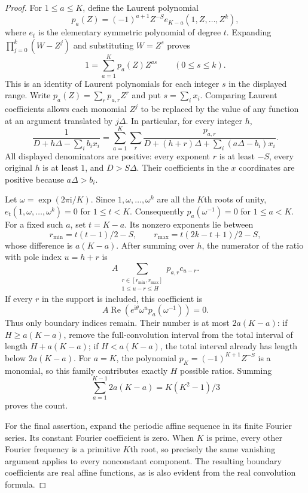\documentclass[11pt]{article}
\begin{document}
\begin{proof}
For $1\le a\le K$, define the Laurent polynomial
\[
 p_a(Z)=(-1)^{a+1}Z^{-S}
 e_{K-a}(1,Z,\ldots,Z^k),
\]
where $e_t$ is the elementary symmetric polynomial of degree $t$.
Expanding $\prod_{j=0}^k(W-Z^j)$ and substituting $W=Z^s$ proves
\[
 1=\sum_{a=1}^K p_a(Z)Z^{as}
 \qquad(0\le s\le k).
\]
This is an identity of Laurent polynomials for each integer $s$ in
the displayed range. Write $p_a(Z)=\sum_r p_{a,r}Z^r$ and put
$s=\sum_i x_i$. Comparing Laurent coefficients allows each monomial
$Z^j$ to be replaced by the value of any function at an argument
translated by $j\Delta$. In particular, for every integer $h$,
\[
 \frac1{D+h\Delta-\sum_i b_i x_i}
 =\sum_{a=1}^K\sum_r
 \frac{p_{a,r}}
 {D+(h+r)\Delta+\sum_i(a\Delta-b_i)x_i}.
\]
All displayed denominators are positive: every exponent $r$ is at
least $-S$, every original $h$ is at least $1$, and
$D>S\Delta$. Their coefficients in the $x$ coordinates are positive
because $a\Delta>b_i$.

Let $\omega=\exp(2\pi\mathrm{i}/K)$. Since
$1,\omega,\ldots,\omega^k$ are all the $K$th roots of unity,
$e_t(1,\omega,\ldots,\omega^k)=0$ for $1\le t<K$.
Consequently $p_a(\omega^{-1})=0$ for $1\le a<K$.
For a fixed such $a$, set $t=K-a$. Its nonzero exponents lie between
\[
 r_{\min}=t(t-1)/2-S,
 \qquad r_{\max}=t(2k-t+1)/2-S,
\]
whose difference is $a(K-a)$. After summing over $h$, the numerator
of the ratio with pole index $u=h+r$ is
\[
 A\sum_{\substack{r\in[r_{\min},r_{\max}]\\1\le u-r\le H}}
 p_{a,r}c_{u-r}.
\]
If every $r$ in the support is included, this coefficient is
\[
 A\operatorname{Re}\left(
 e^{\mathrm{i}\theta}\omega^u p_a(\omega^{-1})\right)=0.
\]
Thus only boundary indices remain. Their number is at most
$2a(K-a)$: if $H\ge a(K-a)$, remove the full-convolution interval
from the total interval of length $H+a(K-a)$; if $H<a(K-a)$, the
total interval already has length below $2a(K-a)$.
For $a=K$, the polynomial $p_K=(-1)^{K+1}Z^{-S}$ is a monomial,
so this family contributes exactly $H$ possible ratios. Summing
\[
 \sum_{a=1}^{K-1}2a(K-a)=K(K^2-1)/3
\]
proves the count.

For the final assertion, expand the periodic affine sequence in its
finite Fourier series. Its constant Fourier coefficient is zero.
When $K$ is prime, every other Fourier frequency is a primitive
$K$th root, so precisely the same vanishing argument applies to
every nonconstant component. The resulting boundary coefficients
are real affine functions, as is also evident from the real
convolution formula.
\end{proof}
\end{document}
